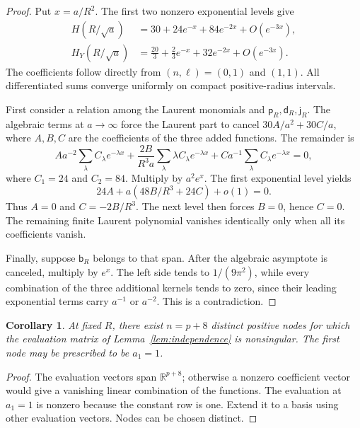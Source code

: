 \documentclass[11pt,letterpaper]{article}
\newtheorem{corollary}{Corollary}
\newcommand{\R}{\mathbb R}
\newcommand{\pker}{\mathsf p}
\newcommand{\jker}{\mathsf j}
\newcommand{\bker}{\mathsf b}
\newcommand{\dker}{\mathsf d}
\begin{document}
\begin{proof}
Put $x=a/R^2$. The first two nonzero exponential levels give
\begin{align}
 H(R/\sqrt a)&=30+24e^{-x}+84e^{-2x}+O(e^{-3x}),\\
 H_Y(R/\sqrt a)&=\tfrac{20}3+\tfrac23e^{-x}+32e^{-2x}+O(e^{-3x}).
\end{align}
The coefficients follow directly from $(n,\ell)=(0,1)$ and $(1,1)$. All differentiated sums converge uniformly on compact positive-radius intervals.

First consider a relation among the Laurent monomials and $\pker_R,\dker_R,\jker_R$. The algebraic terms at $a\to\infty$ force the Laurent part to cancel $30A/a^2+30C/a$, where $A,B,C$ are the coefficients of the three added functions. The remainder is
\begin{equation}
 A a^{-2}\sum_\lambda C_\lambda e^{-\lambda x}
 +\frac{2B}{R^3a}\sum_\lambda\lambda C_\lambda e^{-\lambda x}
 +C a^{-1}\sum_\lambda C_\lambda e^{-\lambda x}=0,
\end{equation}
where $C_1=24$ and $C_2=84$. Multiply by $a^2e^x$. The first exponential level yields
\begin{equation}
 24A+a(48B/R^3+24C)+o(1)=0.
\end{equation}
Thus $A=0$ and $C=-2B/R^3$. The next level then forces $B=0$, hence $C=0$. The remaining finite Laurent polynomial vanishes identically only when all its coefficients vanish.

Finally, suppose $\bker_R$ belongs to that span. After the algebraic asymptote is canceled, multiply by $e^x$. The left side tends to $1/(9\pi^2)$, while every combination of the three additional kernels tends to zero, since their leading exponential terms carry $a^{-1}$ or $a^{-2}$. This is a contradiction.
\end{proof}

\begin{corollary}\label{cor:nodes}
At fixed $R$, there exist $n=p+8$ distinct positive nodes for which the evaluation matrix of Lemma~\ref{lem:independence} is nonsingular. The first node may be prescribed to be $a_1=1$.
\end{corollary}
\begin{proof}
The evaluation vectors span $\R^{p+8}$; otherwise a nonzero coefficient vector would give a vanishing linear combination of the functions. The evaluation at $a_1=1$ is nonzero because the constant row is one. Extend it to a basis using other evaluation vectors. Nodes can be chosen distinct.
\end{proof}
\end{document}
